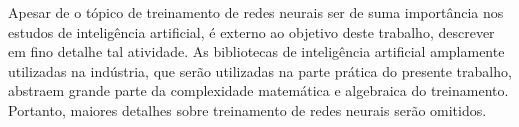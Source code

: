 Apesar de o tópico de treinamento de redes neurais ser de suma importância nos estudos de inteligência artificial, é externo ao objetivo deste trabalho, descrever em fino detalhe tal atividade. As bibliotecas de inteligência artificial amplamente utilizadas na indústria, que serão utilizadas na parte prática do presente trabalho, abstraem grande parte da complexidade matemática e algebraica do treinamento. Portanto, maiores detalhes sobre treinamento de redes neurais serão omitidos.
